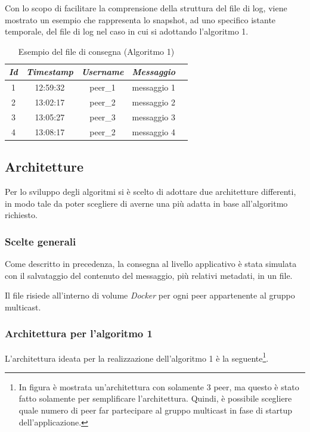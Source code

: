 \documentclass[acmtog]{acmart}
\begin{document}
Con lo scopo di facilitare la comprensione della struttura del file di log, viene mostrato un esempio che rappresenta lo snapshot, ad uno specifico istante temporale, del file di log nel caso in cui si adottando l'algoritmo 1.

\begin{table}[ht!]
  \caption{Esempio del file di consegna (Algoritmo 1)}
  \label{tab:file}
  \begin{tabular}{ccccl}
    \toprule
    \textit{Id} & \textit{Timestamp} & \textit{Username} & \textit{Messaggio} \\
    \midrule
    1 & 12:59:32 & peer\_1 & messaggio 1 \\
    2 & 13:02:17 & peer\_2 & messaggio 2 \\
    3 & 13:05:27 & peer\_3 & messaggio 3 \\
    4 & 13:08:17 & peer\_2 & messaggio 4 \\
  \bottomrule
\end{tabular}
\end{table}

\subsection{Architetture}\label{subsec:architetture}
Per lo sviluppo degli algoritmi si è scelto di adottare due architetture differenti, in modo tale da poter scegliere di averne una più adatta in base all'algoritmo richiesto.

\subsubsection{Scelte generali} Come descritto in precedenza, la consegna al livello applicativo è stata simulata con il salvataggio del contenuto del messaggio, più relativi metadati, in un file. 

Il file risiede all'interno di volume \textit{Docker} per ogni peer appartenente al gruppo multicast.

\subsubsection{Architettura per l'algoritmo 1}
L'architettura ideata per la realizzazione dell'algoritmo 1 è la seguente\footnote{In figura è mostrata un'architettura con solamente $3$ peer, ma questo è stato fatto solamente per semplificare l'architettura. Quindi, è possibile scegliere quale numero di peer far partecipare al gruppo multicast in fase di startup dell'applicazione.}.
\end{document}
